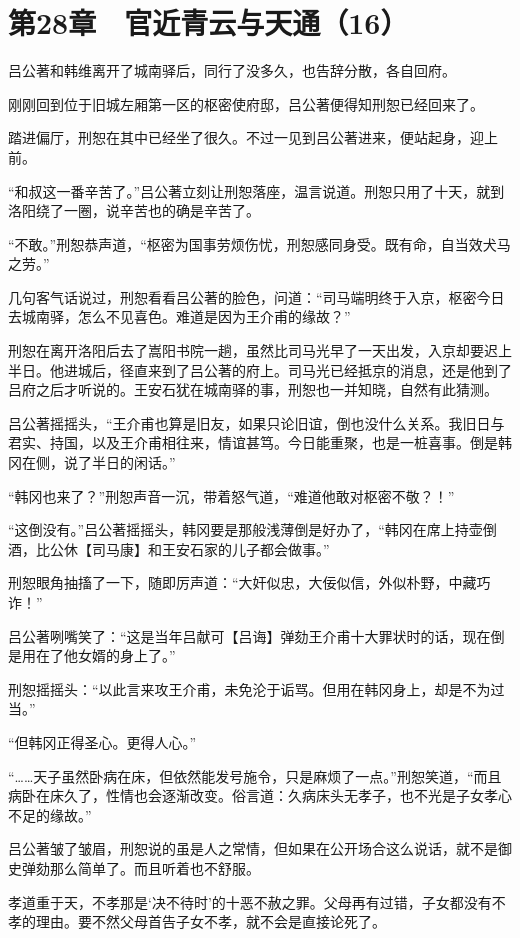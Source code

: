 \section{第28章　官近青云与天通（16）}

吕公著和韩维离开了城南驿后，同行了没多久，也告辞分散，各自回府。

刚刚回到位于旧城左厢第一区的枢密使府邸，吕公著便得知刑恕已经回来了。

踏进偏厅，刑恕在其中已经坐了很久。不过一见到吕公著进来，便站起身，迎上前。

“和叔这一番辛苦了。”吕公著立刻让刑恕落座，温言说道。刑恕只用了十天，就到洛阳绕了一圈，说辛苦也的确是辛苦了。

“不敢。”刑恕恭声道，“枢密为国事劳烦伤忧，刑恕感同身受。既有命，自当效犬马之劳。”

几句客气话说过，刑恕看看吕公著的脸色，问道：“司马端明终于入京，枢密今日去城南驿，怎么不见喜色。难道是因为王介甫的缘故？”

刑恕在离开洛阳后去了嵩阳书院一趟，虽然比司马光早了一天出发，入京却要迟上半日。他进城后，径直来到了吕公著的府上。司马光已经抵京的消息，还是他到了吕府之后才听说的。王安石犹在城南驿的事，刑恕也一并知晓，自然有此猜测。

吕公著摇摇头，“王介甫也算是旧友，如果只论旧谊，倒也没什么关系。我旧日与君实、持国，以及王介甫相往来，情谊甚笃。今日能重聚，也是一桩喜事。倒是韩冈在侧，说了半日的闲话。”

“韩冈也来了？”刑恕声音一沉，带着怒气道，“难道他敢对枢密不敬？！”

“这倒没有。”吕公著摇摇头，韩冈要是那般浅薄倒是好办了，“韩冈在席上持壶倒酒，比公休【司马康】和王安石家的儿子都会做事。”

刑恕眼角抽搐了一下，随即厉声道：“大奸似忠，大佞似信，外似朴野，中藏巧诈！”

吕公著咧嘴笑了：“这是当年吕献可【吕诲】弹劾王介甫十大罪状时的话，现在倒是用在了他女婿的身上了。”

刑恕摇摇头：“以此言来攻王介甫，未免沦于诟骂。但用在韩冈身上，却是不为过当。”

“但韩冈正得圣心。更得人心。”

“……天子虽然卧病在床，但依然能发号施令，只是麻烦了一点。”刑恕笑道，“而且病卧在床久了，性情也会逐渐改变。俗言道：久病床头无孝子，也不光是子女孝心不足的缘故。”

吕公著皱了皱眉，刑恕说的虽是人之常情，但如果在公开场合这么说话，就不是御史弹劾那么简单了。而且听着也不舒服。

孝道重于天，不孝那是‘决不待时’的十恶不赦之罪。父母再有过错，子女都没有不孝的理由。要不然父母首告子女不孝，就不会是直接论死了。

